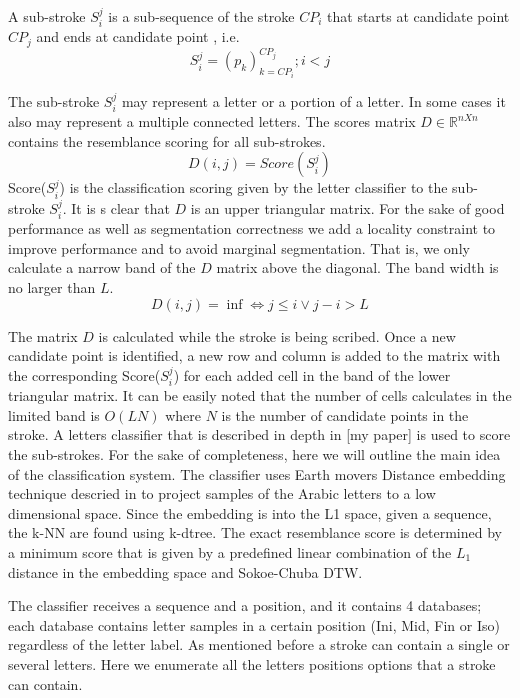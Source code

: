 \documentclass[journal,compsoc]{IEEEtran}
\begin{document}
A sub-stroke $S_{i}^{j}$ is a sub-sequence of the stroke $CP_{i}$ that starts at candidate point $CP_{j}$ and ends at candidate point , i.e.
\begin{equation}
S_{i}^{j}=(p_{k})_{k=CP_{i}}^{CP_{j}}; i<j
\end{equation}

The sub-stroke  $S_{i}^{j}$ may represent a letter or a portion of a letter. In some cases it also may represent a multiple connected letters. The scores matrix $D\in\mathbb{R}^{nXn}$ contains the resemblance scoring for all sub-strokes. 
\begin{equation}
D(i,j)=Score(S_{i}^{j})
\end{equation}
Score($S_{i}^{j}$) is the classification scoring given by the letter classifier to the sub-stroke $S_{i}^{j}$. It is s clear that $D$ is an upper triangular matrix. For the sake of good performance as well as segmentation correctness we add a locality constraint to improve performance and to avoid marginal segmentation. That is, we only calculate a narrow band of the $D$ matrix above the diagonal. The band width is no larger than $L$.
\begin{equation}
D(i,j)=\inf \Leftrightarrow j \leq i \vee j-i>L 
\end{equation}

The matrix $D$ is calculated while the stroke is being scribed. Once a new candidate point is identified, a new row and column is added to the matrix with the corresponding Score($S_{i}^{j}$) for each added cell in the band of the lower triangular matrix. It can be easily noted that the number of cells calculates in the limited band is $O(LN)$ where $N$ is the number of candidate points in the stroke. 
A letters classifier that is described in depth in [my paper] is used to score the sub-strokes. For the sake of completeness, here we will outline the main idea of the classification system. The classifier uses Earth movers Distance embedding technique descried in \cite{shirdhonkar2008approximate} to project samples of the Arabic letters to a low dimensional space. Since the embedding is into the L1 space, given a sequence, the k-NN are found using k-dtree. The exact resemblance score is determined by a minimum score that is given by a predefined linear combination of the $L_{1}$ distance in the embedding space and Sokoe-Chuba DTW.

The classifier receives a sequence and a position, and it contains 4 databases; each database contains letter samples in a certain position (Ini, Mid, Fin or Iso) regardless of the letter label. As mentioned before a stroke can contain a single or several letters. Here we enumerate all the letters positions options that a stroke can contain.  
\end{document}
